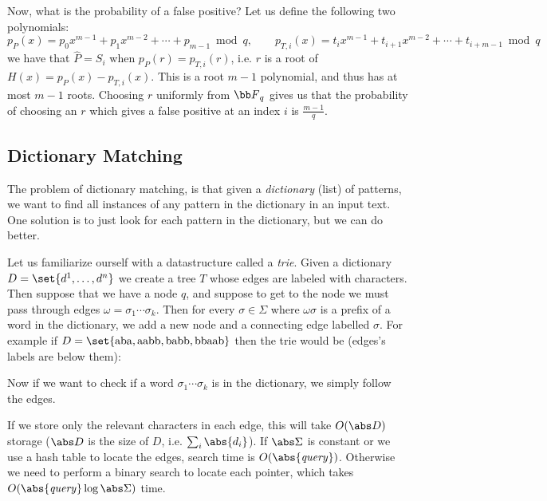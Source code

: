 Now, what is the probability of a false positive?
Let us define the following two polynomials:
$$ p_P(x) = p_0x^{m-1} + p_1x^{m-2} + \cdots + p_{m-1} \bmod q,\qquad p_{T,i}(x) = t_ix^{m-1} + t_{i+1}x^{m-2} + \cdots + t_{i+m-1} \bmod q $$
we have that $\hat P=S_i$ when $p_P(r)=p_{T,i}(r)$, i.e. $r$ is a root of $H(x)=p_P(x)-p_{T,i}(x)$.
This is a root $m-1$ polynomial, and thus has at most $m-1$ roots.
Choosing $r$ uniformly from ${\bb F}_q$ gives us that the probability of choosing an $r$ which gives a false positive at an index $i$ is $\frac{m-1}q$.

\subsection{Dictionary Matching}

The problem of dictionary matching, is that given a {\it dictionary} (list) of patterns, we want to find all instances of any pattern in the dictionary in an input text.
One solution is to just look for each pattern in the dictionary, but we can do better.

Let us familiarize ourself with a datastructure called a {\it trie}.
Given a dictionary $D=\set{d^1,\dots,d^n}$ we create a tree $T$ whose edges are labeled with characters.
Then suppose that we have a node $q$, and suppose to get to the node we must pass through edges $\omega=\sigma_1\cdots\sigma_k$.
Then for every $\sigma\in\Sigma$ where $\omega\sigma$ is a prefix of a word in the dictionary, we add a new node and a connecting edge labelled $\sigma$.
For example if $D=\set{{\rm aba,aabb,babb,bbaab}}$ then the trie would be (edges's labels are below them):

\centerline{}

Now if we want to check if a word $\sigma_1\cdots\sigma_k$ is in the dictionary, we simply follow the edges.

If we store only the relevant characters in each edge, this will take $O(\abs D)$ storage ($\abs D$ is the size of $D$, i.e. $\sum_i\abs{d_i}$).
If $\abs\Sigma$ is constant or we use a hash table to locate the edges, search time is $O(\abs{\it query})$.
Otherwise we need to perform a binary search to locate each pointer, which takes $O(\abs{\it query}\log\abs\Sigma)$ time.

